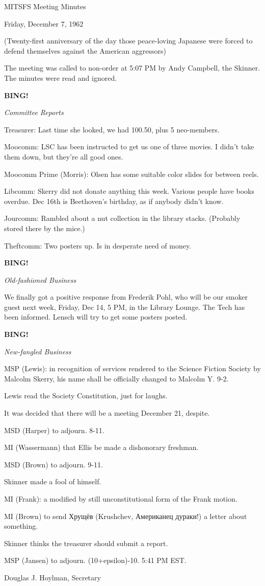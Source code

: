\documentclass[12pt]{article}
\newcommand{\bing}{{\bf BING!} }
\newcommand{\goto}[1]{\bing \vskip 12pt \centerline{{\em{#1}}}}
\begin{document}
\begin{center}

MITSFS Meeting Minutes

Friday, December 7, 1962

(Twenty-first anniversary of the day those peace-loving Japanese were forced to defend themselves against the American aggressors)

\end{center}
 
\vspace{12pt}

\setlength{\parskip}{6pt}

\noindent
The meeting was called to non-order at 5:07 PM by Andy Campbell, the Skinner. The minutes were read and ignored.

\goto{Committee Reports}

Treasurer: Last time she looked, we had 100.50, plus 5 neo-members.

Moocomm: LSC has been instructed to get us one of three movies. I didn't take them down, but they're all good ones.

Moocomm Prime (Morris): Olsen has some suitable color slides for between reels.

Libcomm: Skerry did not donate anything this week. Various people have books overdue. Dec 16th is Beethoven's birthday, as if anybody didn't know.

Jourcomm: Rambled about a nut collection in the library stacks. (Probably stored there by the mice.)

Theftcomm: Two posters up. Is in desperate need of money.

\goto{Old-fashioned Business}

We finally got a positive response from Frederik Pohl, who will be our smoker guest next week, Friday, Dec 14, 5 PM, in the Library Lounge. The Tech has been informed. Lensch will try to get some posters posted.

\goto{New-fangled Business}

MSP (Lewis): in recognition of services rendered to the Science Fiction Society by Malcolm Skerry, his name shall be officially changed to Malcolm Y. 9-2.

Lewis read the Society Constitution, just for laughs.

It was decided that there will be a meeting December 21, despite.

MSD (Harper) to adjourn. 8-11.

MI (Wassermann) that Ellis be made a dishonorary freshman.

MSD (Brown) to adjourn. 9-11.

Skinner made a fool of himself.

MI (Frank): a modified by still unconstitutional form of the Frank motion.

MI (Brown) to send Хрущёв (Krushchev, Американец дураки!) a letter about something.

Skinner thinks the treasurer should submit a report.

MSP (Jansen) to adjourn. (10+epsilon)-10. 5:41 PM EST.

\vspace{12pt}

\centerline{Douglas J. Hoylman, Secretary}
\end{document}
